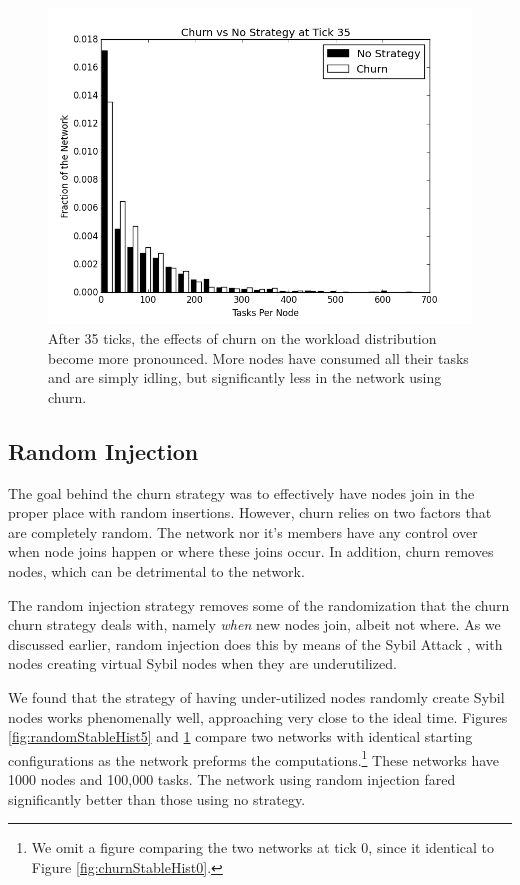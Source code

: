 \begin{figure}
	\centering
	\includegraphics[width=0.7\linewidth]{figs/ChurnStableHist35}
	\caption[Workload for churn at tick 35]{After 35 ticks, the effects of churn on the workload distribution become more pronounced.  More nodes have consumed all their tasks and are simply idling, but significantly less in the network using churn.}
	\label{fig:churnStableHist35}
\end{figure}

\subsection{Random Injection}

The goal behind the churn strategy was to effectively have nodes join in the proper place with random insertions.
However, churn relies on two factors that are completely random.
The network nor it's members have any control over when node joins happen or where these joins occur.
In addition, churn removes nodes, which can be detrimental to the network.

The random injection strategy removes some of the randomization that the churn churn strategy deals with, namely \textit{when} new nodes join, albeit not where.
As we discussed earlier, random injection does this by means of the Sybil Attack \cite{sybil}, with nodes creating virtual Sybil nodes when they are underutilized.

We found that the strategy of having under-utilized nodes randomly create Sybil nodes works phenomenally well, approaching very close to the ideal time.
Figures \ref{fig:randomStableHist5} and \ref{fig:churnStableHist35} compare two networks with identical starting configurations as the network preforms the computations.\footnote{We omit a figure comparing the two networks at tick 0, since it identical to Figure \ref{fig:churnStableHist0}.}
These networks have 1000 nodes and 100,000 tasks.  
The network using random injection fared significantly better than those using no strategy.


